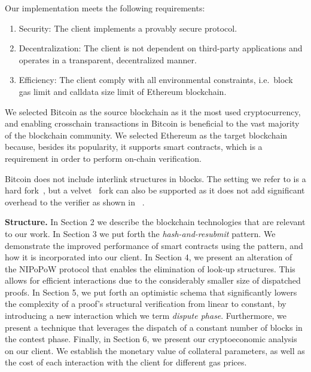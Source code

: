 Our implementation meets the following requirements:
\begin{enumerate}
\item Security: The client implements a provably secure protocol.
\item Decentralization: The client is not dependent on third-party applications
and operates in a transparent, decentralized manner.
\item Efficiency: The client comply with all environmental constraints, i.e.\
block gas limit and calldata size limit of Ethereum blockchain.
\end{enumerate}

We selected Bitcoin as the source blockchain as it the most used cryptocurrency,
and enabling crosschain transactions in Bitcoin is beneficial to the vast
majority of the blockchain community. We selected Ethereum as the target blockchain
because, besides its popularity, it supports smart contracts, which is a
requirement in order to perform on-chain verification.

Bitcoin does not include interlink structures in blocks. The setting we refer
to is a hard fork~\cite{hard-fork}, but a velvet~\cite{velvet-fork} fork can
also be supported as it does not add significant overhead to the verifier as
shown in ~\cite{andri}.

\noindent
\textbf{Structure.} In Section 2 we describe the blockchain technologies that
are relevant to our work. In Section 3 we put forth the
\emph{hash-and-resubmit} pattern. We demonstrate the improved performance of
smart contracts using the pattern, and how it is incorporated into our
client. In Section 4, we present an alteration of the NIPoPoW protocol that
enables the elimination of look-up structures. This allows for efficient
interactions due to the considerably smaller size of dispatched proofs. In
Section 5, we put forth an optimistic schema that significantly lowers the
complexity of a proof's structural verification from linear to constant, by
introducing a new interaction which we term \emph{dispute phase}. Furthermore,
we present a technique that leverages the dispatch of a constant number of blocks
in the contest phase. Finally, in Section 6, we present our cryptoeconomic analysis
on our client. We establish the monetary value of collateral parameters, as well
as the cost of each interaction with the client for different gas prices.
